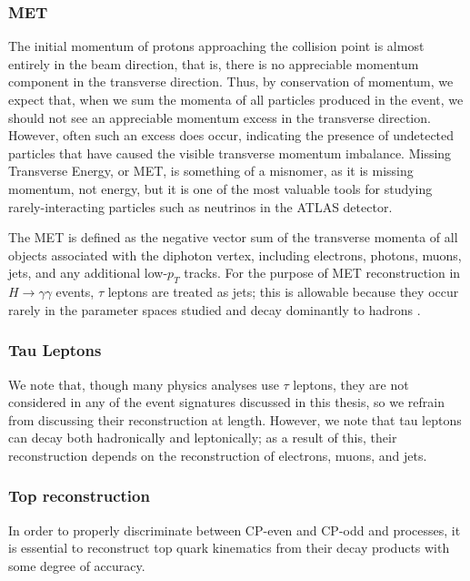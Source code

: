 \subsubsection{MET} \label{sec:MET}

The initial momentum of protons approaching the collision point is almost entirely in the beam direction, that is, there is no appreciable momentum component in the transverse direction. Thus, by conservation of momentum, we expect that, when we sum the momenta of all particles produced in the event, we should not see an appreciable momentum excess in the transverse direction. However, often such an excess does occur, indicating the presence of undetected particles that have caused the visible transverse momentum imbalance. Missing Transverse Energy, or MET, is something of a misnomer, as it is missing momentum, not energy, but it is one of the most valuable tools for studying rarely-interacting particles such as neutrinos in the ATLAS detector.

The MET is defined as the negative vector sum of the transverse  momenta of all objects associated with the diphoton vertex, including electrons, photons, muons, jets, and any additional low-$p_{T}$ tracks. For the purpose of MET reconstruction in $H \rightarrow \gamma \gamma$ events, $\tau$ leptons are treated as jets; this is allowable because they occur rarely in the parameter spaces studied and decay dominantly to hadrons \cite{CERN-EP-2017-274}.

\subsubsection{Tau Leptons} \label{sec:taus}
We note that, though many physics analyses use $\tau$ leptons, they are not considered in any of the event signatures discussed in this thesis, so we refrain from discussing their reconstruction at length. However, we note that tau leptons can decay both hadronically and leptonically; as a result of this, their reconstruction depends on the reconstruction of electrons, muons, and jets.

\subsubsection{Top reconstruction}
\label{sssec:ttbar_reco}

In order to properly discriminate between CP-even and CP-odd \ttH and \tH processes, it is essential to reconstruct top quark kinematics from their decay products with some degree of accuracy.

